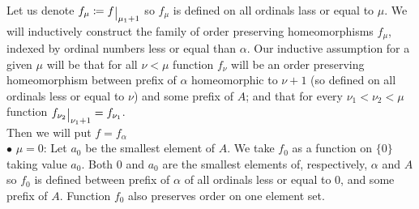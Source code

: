 Let us denote $f_\mu \coloneqq f\raisebox{-0.5\depth}{\big|}_{\mu_1 + 1}$ so 
$f_\mu$ is defined on all ordinals lass or equal to $\mu$.
We will inductively construct the family of order preserving homeomorphisms $f_\mu$, 
indexed by ordinal numbers less 
or equal
than 
$\alpha$. 
Our inductive assumption for a given $\mu$ will be that 
for all $\nu < \mu$ function $f_\nu$ will be an order preserving homeomorphism 
between prefix of $\alpha$ homeomorphic to $\nu + 1$ (so defined on all ordinals less 
or equal to $\nu$) 
and some prefix of $A$; and that for every $\nu_1 < \nu_2 < \mu$ function 
$f_{\nu_2}\raisebox{-0.5\depth}{\big|}_{\nu_1 + 1} = f_{\nu_1}$. \\ 
Then we will put $f = f_\alpha$\\[8pt]
$\bullet$ $\mu = 0$: Let $a_0$ be the smallest element of $A$. 
We take $f_0$ as a function on $\{0\}$ taking value $a_0$. 
Both $0$ and $a_0$ are the smallest elements of, respectively, $\alpha$ and $A$ 
so $f_0$ is defined between prefix of $\alpha$ of all ordinals less or equal to $0$, and 
some prefix of $A$. 
Function $f_0$ also preserves order on one element set.

